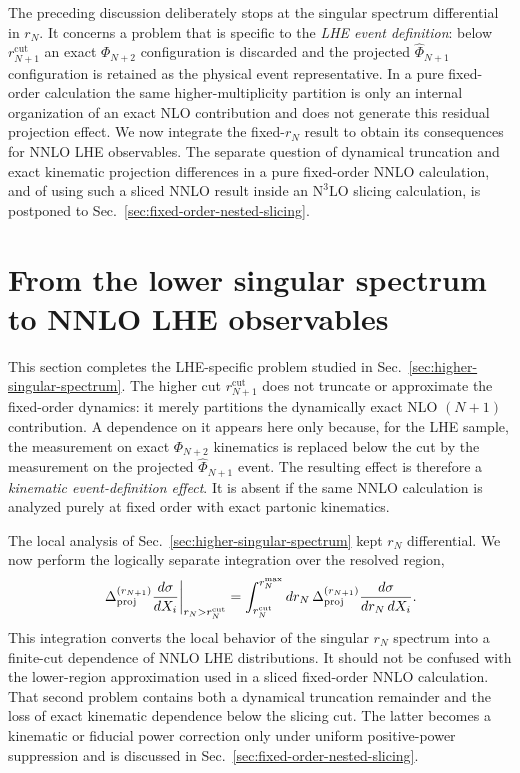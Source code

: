 \documentclass[11pt]{article}
\newcommand{\rn}{r_N}
\newcommand{\rnp}{r_{N+1}}
\newcommand{\cut}{\mathrm{cut}}
\newcommand{\Ph}{\Phi}
\begin{document}
The preceding discussion deliberately stops at the singular spectrum differential in $\rn$.
It concerns a problem that is specific to the \emph{LHE event definition}: below $\rnp^{\cut}$ an exact
$\Ph_{N+2}$ configuration is discarded and the projected $\widehat\Ph_{N+1}$ configuration is retained as the
physical event representative. In a pure fixed-order calculation the same higher-multiplicity partition is
only an internal organization of an exact NLO contribution and does not generate this residual projection
effect. We now integrate the fixed-$\rn$ result to obtain its consequences for NNLO LHE observables. The
separate question of dynamical truncation and exact kinematic projection differences in a pure fixed-order NNLO calculation,
and of using such a sliced NNLO result inside an $\mathrm{N}^3\mathrm{LO}$ slicing calculation, is postponed to
Sec.~\ref{sec:fixed-order-nested-slicing}.

\section{From the lower singular spectrum to NNLO LHE observables}
\label{sec:nnlo-differential-predictions}

This section completes the LHE-specific problem studied in Sec.~\ref{sec:higher-singular-spectrum}. The
higher cut $\rnp^{\cut}$ does not truncate or approximate the fixed-order dynamics: it merely partitions the
dynamically exact NLO $(N+1)$ contribution. A dependence on it appears here only because, for the LHE sample,
the measurement on exact $\Ph_{N+2}$ kinematics is replaced below the cut by the measurement on the projected
$\widehat\Ph_{N+1}$ event. The resulting effect is therefore a \emph{kinematic event-definition effect}.
It is absent if the same NNLO calculation is analyzed purely at fixed order with exact partonic kinematics.

The local analysis of Sec.~\ref{sec:higher-singular-spectrum} kept $\rn$ differential. We now perform the
logically separate integration over the resolved region,
\begin{equation}
\left.\Delta_{\rm proj}^{(\rnp)}\frac{d\sigma}{dX_i}\right|_{\rn>\rn^{\cut}}
=
\int_{\rn^{\cut}}^{\rn^{\rm max}} d\rn\,
\Delta_{\rm proj}^{(\rnp)}\frac{d\sigma}{d\rn\,dX_i}.
\label{eq:integrated-higher-projection-definition}
\end{equation}
This integration converts the local behavior of the singular $\rn$ spectrum into a finite-cut dependence of
NNLO LHE distributions. It should not be confused with the lower-region approximation used in a sliced
fixed-order NNLO calculation. That second problem contains both a dynamical truncation remainder and the loss
of exact kinematic dependence below the slicing cut. The latter becomes a kinematic or fiducial power
correction only under uniform positive-power suppression and is discussed in
Sec.~\ref{sec:fixed-order-nested-slicing}.
\end{document}
